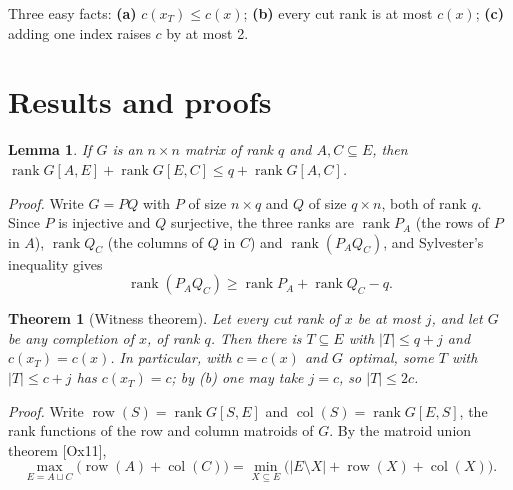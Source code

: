 \documentclass[11pt,letterpaper,reqno]{amsart}
\theoremstyle{spaced}
\newtheorem{theorem}{Theorem}
\newtheorem{lemma}{Lemma}
\begin{document}
Three easy facts: \textbf{(a)} \(c(x_T) \le c(x)\); \textbf{(b)} every cut rank is at most \(c(x)\); \textbf{(c)} adding one index raises \(c\) by at most 2.

\hypertarget{results-and-proofs}{%
\section{Results and proofs}\label{results-and-proofs}}

\begin{lemma}
If \(G\) is an \(n \times n\) matrix of rank \(q\) and \(A, C \subseteq E\), then \(\operatorname{rank} G[A, E] + \operatorname{rank} G[E, C] \le q + \operatorname{rank} G[A, C]\).
\end{lemma}

\begingroup{} \emph{Proof.} Write \(G = PQ\) with \(P\) of size \(n \times q\) and \(Q\) of size \(q \times n\), both of rank \(q\). Since \(P\) is injective and \(Q\) surjective, the three ranks are \(\operatorname{rank} P_A\) (the rows of \(P\) in \(A\)), \(\operatorname{rank} Q_C\) (the columns of \(Q\) in \(C\)) and \(\operatorname{rank}(P_A Q_C)\), and Sylvester's inequality gives
\[\operatorname{rank}(P_A Q_C) \ge \operatorname{rank} P_A + \operatorname{rank} Q_C - q. \tag*{$\square$}\]\par\endgroup

\begin{theorem}[Witness theorem]
Let every cut rank of \(x\) be at most \(j\), and let \(G\) be any completion of \(x\), of rank \(q\). Then there is \(T \subseteq E\) with \(\lvert T\rvert \le q + j\) and \(c(x_T) = c(x)\). In particular, with \(c = c(x)\) and \(G\) optimal, some \(T\) with \(\lvert T\rvert \le c + j\) has \(c(x_T) = c\); by (b) one may take \(j = c\), so \(\lvert T\rvert \le 2c\).
\end{theorem}

\begingroup{} \emph{Proof.} Write \(\operatorname{row}(S) = \operatorname{rank} G[S, E]\) and \(\operatorname{col}(S) = \operatorname{rank} G[E, S]\), the rank functions of the row and column matroids of \(G\). By the matroid union theorem {[}Ox11{]},
\[\max_{E = A \sqcup C}\big(\operatorname{row}(A) + \operatorname{col}(C)\big) = \min_{X \subseteq E}\big(\lvert E \setminus X\rvert + \operatorname{row}(X) + \operatorname{col}(X)\big).\]\par\endgroup
\end{document}
